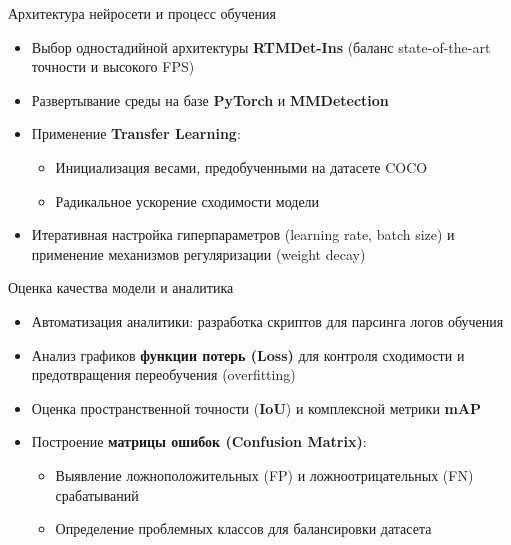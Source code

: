 \documentclass[hyperref={unicode}]{beamer}
\begin{document}
\begin{frame}{Архитектура нейросети и процесс обучения}
\begin{itemize}
    \item Выбор одностадийной архитектуры \textbf{RTMDet-Ins} (баланс state-of-the-art точности и высокого FPS)
    \item Развертывание среды на базе \textbf{PyTorch} и \textbf{MMDetection}
    \item Применение \textbf{Transfer Learning}: 
    \begin{itemize}
        \item Инициализация весами, предобученными на датасете COCO
        \item Радикальное ускорение сходимости модели
    \end{itemize}
    \item Итеративная настройка гиперпараметров (learning rate, batch size) и применение механизмов регуляризации (weight decay)
\end{itemize}
\end{frame}

\begin{frame}{Оценка качества модели и аналитика}
\begin{itemize}
    \item Автоматизация аналитики: разработка скриптов для парсинга логов обучения
    \item Анализ графиков \textbf{функции потерь (Loss)} для контроля сходимости и предотвращения переобучения (overfitting)
    \item Оценка пространственной точности (\textbf{IoU}) и комплексной метрики \textbf{mAP}
    \item Построение \textbf{матрицы ошибок (Confusion Matrix)}:
    \begin{itemize}
        \item Выявление ложноположительных (FP) и ложноотрицательных (FN) срабатываний
        \item Определение проблемных классов для балансировки датасета
    \end{itemize}
\end{itemize}
\end{frame}
\end{document}
